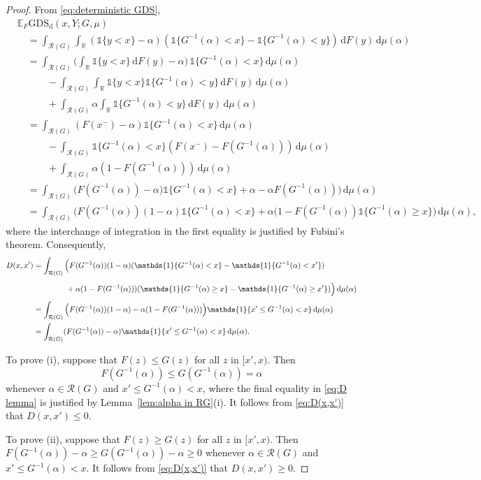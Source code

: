 \documentclass[10pt]{article} %
\theoremstyle{theorem}
\theoremstyle{definition}
\newcommand{\RRR}{\mathbb{R}}
\newcommand{\EEE}{\mathbb{E}}
\newcommand{\dd}{\mathrm{d}}
\newcommand{\one}{\mathds{1}}
\newcommand{\GDSd}{\mathrm{GDS}_\mathrm{d}}
\newcommand{\RG}{\mathcal{R}(G)}
\begin{document}
\begin{proof}
From \eqref{eq:deterministic GDS},
\begin{align*}
&\EEE_F \GDSd(x,Y;G,\mu) \\
&\quad= \int_{\RG}\int_\RRR  (\one\{y<x\} - \alpha)(\one\{G^{-1}(\alpha) < x\} - \one\{G^{-1}(\alpha) < y\}) \,\dd F(y)\,\dd\mu(\alpha) \\
&\quad= \int_{\RG} \Big(\int_\RRR \one\{y<x\}\,\dd F(y) - \alpha \Big)\,\one\{G^{-1}(\alpha) < x\} \,\dd\mu(\alpha) \\
&\quad \qquad - \int_{\RG} \int_\RRR \one\{y<x\} \one\{G^{-1}(\alpha) < y\} \, \dd F(y) \,\dd\mu(\alpha) \\
&\quad \qquad + \int_{\RG} \alpha \int_\RRR \one\{G^{-1}(\alpha) < y\} \, \dd F(y) \,\dd\mu(\alpha) \\
&\quad= \int_{\RG} (F(x^-)-\alpha)\one\{G^{-1}(\alpha)<x\}\,\dd\mu(\alpha) \\
&\quad \qquad - \int_{\RG} \one\{G^{-1}(\alpha) < x\} (F(x^-)-F(G^{-1}(\alpha))) \,\dd\mu(\alpha) \\
&\quad \qquad + \int_{\RG} \alpha (1 - F(G^{-1}(\alpha))) \, \dd\mu(\alpha) \\
&\quad= \int_{\RG} \big( F(G^{-1}(\alpha)) - \alpha) \one\{G^{-1}(\alpha)<x\} + \alpha - \alpha F(G^{-1}(\alpha)) \big) \,\dd\mu(\alpha) \\
&\quad= \int_{\RG} \big( F(G^{-1}(\alpha))(1-\alpha)\one\{G^{-1}(\alpha)<x\} + \alpha(1-F(G^{-1}(\alpha))\one\{G^{-1}(\alpha)\geq x\} \big) \,\dd\mu(\alpha),
\end{align*}
where the interchange of integration in the first equality is justified by Fubini's theorem. Consequently,
\begin{align}
D(x,x')
&= \int_{\RG} \Big( F(G^{-1}(\alpha))(1-\alpha)(\one\{G^{-1}(\alpha) < x\} - \one\{G^{-1}(\alpha) < x'\}) \notag\\ 
&\qquad\phantom{\int_0^1 \Big(} + \alpha(1-F(G^{-1}(\alpha)))(\one\{G^{-1}(\alpha) \geq x\}- \one\{G^{-1}(\alpha) \geq x'\}) \Big) \,\dd\mu(\alpha) \notag\\
&= \int_{\RG} \Big( F(G^{-1}(\alpha))(1-\alpha) - \alpha(1-F(G^{-1}(\alpha)))\Big)\one\{ x'\leq G^{-1}(\alpha) < x\} \,\dd\mu(\alpha) \notag\\
&= \int_{\RG} (F(G^{-1}(\alpha)) - \alpha) \one\{x' \leq G^{-1}(\alpha) < x\} \,\dd\mu(\alpha). \label{eq:D(x,x')}
\end{align}

To prove (i), suppose that $F(z)\leq G(z)$ for all $z$ in $[x',x)$. Then
\begin{equation}\label{eq:D lemma}
F(G^{-1}(\alpha)) \leq G(G^{-1}(\alpha))=\alpha
\end{equation}
whenever $\alpha\in\RG$ and $x' \leq G^{-1}(\alpha) < x$, where the final equality in \eqref{eq:D lemma} is justified by Lemma~\ref{lem:alpha in RG}(i).
It follows from \eqref{eq:D(x,x')} that $D(x,x')\leq 0$.

To prove (ii), suppose that $F(z)\geq G(z)$ for all $z$ in $[x',x)$. Then $F(G^{-1}(\alpha))-\alpha \geq G(G^{-1}(\alpha)) - \alpha \geq 0$ whenever $\alpha\in\RG$ and $x' \leq G^{-1}(\alpha) < x$. It follows from \eqref{eq:D(x,x')} that $D(x,x')\geq 0$.
\end{proof}
\end{document}
